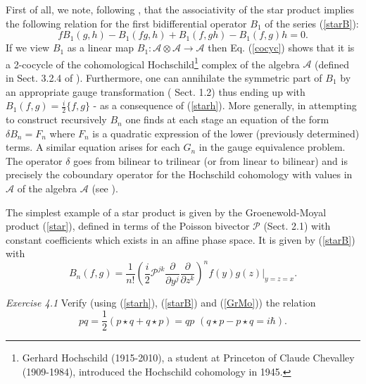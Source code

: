 First of all, we note, following \cite{K}, that the associativity of the star product implies the following relation for 
the first bidifferential operator $B_1$ of the series (\ref{starB}):
\begin{equation}
\label{cocyc}
fB_1(g, h) - B_1(fg, h) + B_1(f, gh) - B_1(f, g)h = 0.
\end{equation}
If we view $B_1$ as a linear map $B_1:  {\mathcal A}\otimes{\mathcal A} \rightarrow {\mathcal A}$ then Eq. (\ref{cocyc}) shows that it is 
a 2-cocycle of the cohomological Hochschild\footnote{Gerhard Hochschild (1915-2010), a student at Princeton of Claude Chevalley (1909-1984),
introduced the Hochschild cohomology in 1945.} complex of the algebra ${\mathcal A}$ (defined in Sect. 3.2.4 of \cite{K}). Furthermore, one can 
annihilate the symmetric part of $B_1$ by an appropriate gauge transformation (\cite{K} Sect. 1.2) thus ending up with 
$B_1(f, g) = \frac{i}{2}\{f, g\}$ - as a consequence of (\ref{starh}). More generally, in attempting to construct recursively $B_n$ one finds 
at each stage an equation of the form $\delta B_n = F_n$ where $F_n$ is a quadratic expression of the lower (previously determined) terms. A 
similar equation arises for each $G_n$ in the gauge equivalence problem. The operator $\delta$ goes from bilinear to trilinear (or from linear 
to bilinear) and is precisely the coboundary operator for the Hochschild cohomology with values in ${\mathcal A}$ of the algebra ${\mathcal A}$
(see \cite{W94}).

The simplest example of a star product is given by the Groenewold-Moyal product (\ref{star}), defined in terms of the Poisson bivector ${\mathcal P}$
(Sect. 2.1) with constant coefficients which exists in an affine phase space. It is given by (\ref{starB}) with
\begin{equation}
\label{GrMo}
B_n(f, g) = \frac{1}{n!}(\frac{i}{2}{\mathcal P}^{jk}\frac{\partial}{\partial y^j}\frac{\partial}{\partial z^k})^n f(y) g(z)|_{y=z=x}. 
\end{equation}

{\it Exercise 4.1} Verify (using (\ref{starh}), (\ref{starB}) and (\ref{GrMo})) the relation
\begin{equation}
\label{Wpq}
pq = \frac{1}{2}(p\star q + q\star p) = qp \, \, (q\star p - p\star q = i\hbar).
\end{equation}

